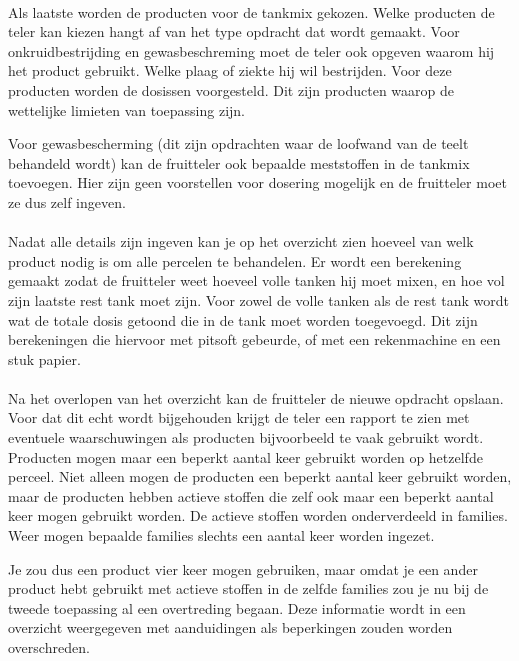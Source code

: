 \paragraph {} Als laatste worden de producten voor de tankmix gekozen. Welke producten de
teler kan kiezen hangt af van het type opdracht dat wordt gemaakt. Voor onkruidbestrijding
en gewasbeschreming moet de teler ook opgeven waarom hij het product gebruikt. Welke plaag
of ziekte hij wil bestrijden. Voor deze producten worden de dosissen voorgesteld. Dit zijn
producten waarop de wettelijke limieten van toepassing zijn.

Voor gewasbescherming (dit zijn opdrachten waar de loofwand van de teelt behandeld wordt)
kan de fruitteler ook bepaalde meststoffen in de tankmix toevoegen. Hier zijn geen
voorstellen voor dosering mogelijk en de fruitteler moet ze dus zelf ingeven.

\paragraph {} Nadat alle details zijn ingeven kan je op het overzicht zien hoeveel van welk
product nodig is om alle percelen te behandelen. Er wordt een berekening gemaakt zodat de
fruitteler weet hoeveel volle tanken hij moet mixen, en hoe vol zijn laatste rest tank
moet zijn. Voor zowel de volle tanken als de rest tank wordt wat de totale dosis getoond
die in de tank moet worden toegevoegd. Dit zijn berekeningen die hiervoor met pitsoft
gebeurde, of met een rekenmachine en een stuk papier.

\paragraph {} Na het overlopen van het overzicht kan de fruitteler de nieuwe opdracht
opslaan. Voor dat dit echt wordt bijgehouden krijgt de teler een rapport te zien met
eventuele waarschuwingen als producten bijvoorbeeld te vaak gebruikt wordt. Producten
mogen maar een beperkt aantal keer gebruikt worden op hetzelfde perceel. Niet alleen mogen
de producten een beperkt aantal keer gebruikt worden, maar de producten hebben actieve
stoffen die zelf ook maar een beperkt aantal keer mogen gebruikt worden. De actieve
stoffen worden onderverdeeld in families. Weer mogen bepaalde families slechts een aantal
keer worden ingezet.

Je zou dus een product vier keer mogen gebruiken, maar omdat je een ander product hebt
gebruikt met actieve stoffen in de zelfde families zou je nu bij de tweede toepassing al
een overtreding begaan. Deze informatie wordt in een overzicht weergegeven met
aanduidingen als beperkingen zouden worden overschreden.

